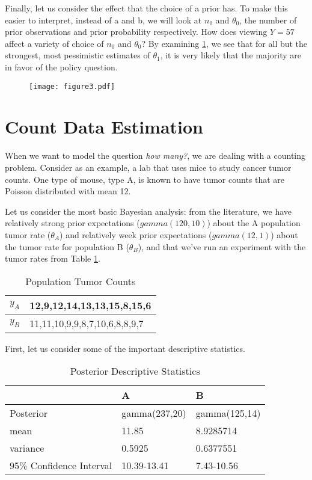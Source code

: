 \documentclass[12pt]{article}
\begin{document}
Finally, let us consider the effect that the choice of a prior has. To make this easier to interpret, instead of a and b, we will look at $n_0$ and $\theta_0$, the number of prior observations and prior probability respectively. How does viewing $Y=57$ affect a variety of choice of $n_0$ and $\theta_0$? By examining \ref{contour}, we see that for all but the strongest, most pessimistic estimates of $\theta_1$, it is very likely that the majority are in favor of the policy question.

\begin{figure}
    \label{contour}
    \centering
    \texttt{[image: figure3.pdf]}
\end{figure}


\section{Count Data Estimation}
When we want to model the question \emph{how many?}, we are dealing with a counting problem. Consider as an example, a lab that uses mice to study cancer tumor counts. One type of mouse, type A, is known to have tumor counts that are Poisson distributed with mean 12. 

Let us consider the most basic Bayesian analysis: from the literature, we have relatively strong prior expectations ($gamma(120,10)$) about the A population tumor rate ($\theta_A$) and relatively week prior expectations ($gamma(12,1)$) about the tumor rate for population B ($\theta_B$), and that we've run an experiment with the tumor rates from Table \ref{tab:tumorcounts}.

\begin{table}
\caption {Population Tumor Counts} \label{tab:tumorcounts}
\begin{center}
\begin{tabular}{| l | l |}
\hline
$y_A$ & 12,9,12,14,13,13,15,8,15,6 \\
\hline
$y_B$ & 11,11,10,9,9,8,7,10,6,8,8,9,7 \\
\hline
\end{tabular}
\end{center}
\end{table}

First, let us consider some of the important descriptive statistics.

\begin{table}
\caption {Posterior Descriptive Statistics} \label{tab:tumorcountstats}
\begin{center}
\begin{tabular}{| l | l | l |}
\hline
 & A & B \\
\hline
Posterior & gamma(237,20) & gamma(125,14) \\
\hline
mean & 11.85 & 8.9285714 \\
\hline
variance & 0.5925  &  0.6377551 \\
\hline
95\% Confidence Interval & 10.39-13.41 & 7.43-10.56 \\
\hline
\end{tabular}
\end{center}
\end{table}
\end{document}
